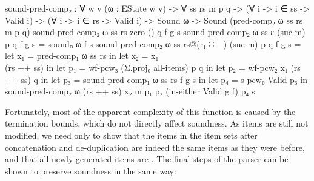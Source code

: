 		\begin{code}
			  sound-pred-comp₂ : ∀ {w v} (ω : EState w v) -> ∀ ss rs m p q ->
			    (∀ {i} -> i ∈ ss -> Valid i) ->
			    (∀ {i} -> i ∈ rs -> Valid i) ->
			    Sound ω -> Sound (pred-comp₂ ω ss rs m p q)
			  sound-pred-comp₂ ω ss rs zero () q f g s
			  sound-pred-comp₂ ω ss ε (suc m) p q f g s = soundₙ ω f s
			  sound-pred-comp₂ ω ss rs@(r₁ ∷ _) (suc m) p q f g s =
			    let x₁ = pred-comp₁ ω ss rs in
			    let x₂ = x₁ \\ (rs ++ ss) in
			    let p₁ = wf-pcw₃ (Σ.proj₀ all-items) p q  in
			    let p₂ = wf-pcw₂ x₁ (rs ++ ss) q in
			    let p₃ = sound-pred-comp₁ ω ss rs f g s in
			    let p₄ = s-pcw₀ Valid p₃ in
			    sound-pred-comp₂ ω (rs ++ ss) x₂ m p₁ p₂ (in-either Valid g f) p₄ s
		\end{code}

		Fortunately, most of the apparent complexity of this function is caused
		by the termination bounds, which do not directly affect soundness. As
		items are still not modified, we need only to show that the items in
		the item sets after concatenation and de-duplication are indeed the
		same items as they were before, and that all newly generated items are
		. The final steps of the parser can be shown to preserve
		soundness in the same way:

